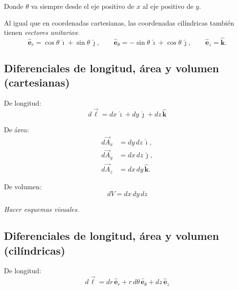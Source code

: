 \documentclass[a4paper,12pt]{article}
\begin{document}
Donde $\theta$ va siempre desde el eje positivo de $x$ al eje positivo de $y$.

Al igual que en coordenadas cartesianas, las coordenadas cilíndricas también tienen \textit{vectores unitarios}:
\[
\hat{\mathbf e}_r = \cos\theta\,\hat{\imath} + \sin\theta\,\hat{\jmath},\qquad
\hat{\mathbf e}_\theta = -\sin\theta\,\hat{\imath} + \cos\theta\,\hat{\jmath},\qquad
\hat{\mathbf e}_z = \hat{\mathbf k}.
\]

\begin{center}
\end{center}

\newpage

\subsection*{Diferenciales de longitud, área y volumen (cartesianas)}

De longitud:
\[
d\vec{\ell} = dx\,\hat{\imath} + dy\,\hat{\jmath} + dz\,\hat{\mathbf k}
\]

De área:
\[
\begin{aligned}
d\vec{A}_x &= dy\,dz\,\hat{\imath},\\
d\vec{A}_y &= dx\,dz\,\hat{\jmath},\\
d\vec{A}_z &= dx\,dy\,\hat{\mathbf k}.
\end{aligned}
\]

De volumen:
\[
dV = dx\,dy\,dz
\]

\textit{Hacer esquemas visuales.}


\subsection*{Diferenciales de longitud, área y volumen (cilíndricas)}

De longitud:
\[
d\vec{\ell} = dr\,\hat{\mathbf e}_r + r\,d\theta\,\hat{\mathbf e}_\theta + dz\,\hat{\mathbf e}_z
\]
\end{document}
